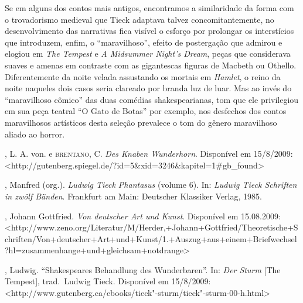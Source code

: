 Se em alguns dos contos mais antigos, encontramos a similaridade da
forma com o trovadorismo medieval que Tieck adaptava talvez
concomitantemente, no desenvolvimento das narrativas fica visível o
esforço por prolongar os interstícios que introduzem, enfim, 
o ``maravilhoso'', efeito de postergação que admirou e elogiou em \textit{The Tempest} e
\textit{A Midsummer Night's Dream}, peças que considerava suaves e amenas em
contraste com as gigantescas figuras de Macbeth ou Othello.
Diferentemente da noite velada assustando os mortais em \textit{Hamlet}, o
reino da noite naqueles dois casos seria clareado por branda luz de
luar.  Mas ao invés do ``maravilhoso cômico'' das duas comédias
shakespearianas, tom que ele privilegiou em sua peça teatral ``O Gato de
Botas'' por exemplo, nos desfechos dos contos maravilhosos artísticos desta seleção
prevalece o tom do gênero maravilhoso aliado ao horror.  

\begin{bibliohedra}

, L. A. von. e \textsc{brentano}, C. \textit{Des Knaben Wunderhorn}.
Disponível em 15/8/2009: 
<http://gutenberg.spiegel.de/?id=5\&xid=3246\&\break kapitel=1\#gb\_found>

, Manfred (org.). \textit{Ludwig Tieck Phantasus }(volume
6). In: \textit{Ludwig Tieck Schriften in zwölf Bänden}.  Frankfurt am
Main: Deutscher Klassiker Verlag, 1985. 

, Johann Gottfried. \textit{Von deutscher Art und Kunst}.
Disponível em 15.08.2009: <http://www.zeno.org/Literatur/M/Herder,+Johann\break+Gottfried/Theoretische+Schriften/Von+deutscher+Art+und+\break Kunst/1.+Auszug+aus+einem+Briefwechsel?hl=zusammenhange\break +und+gleichsam+notdrange>

, Ludwig. “Shakespeares Behandlung des Wunderbaren”. In:
\textit{Der Sturm} [The Tempest], trad.~Ludwig Tieck. Disponível em 15/8/2009: 
<http://www.gutenberg.ca/ebooks/tieck"-sturm/tieck"-sturm-00-h.html>

\end{bibliohedra}



















